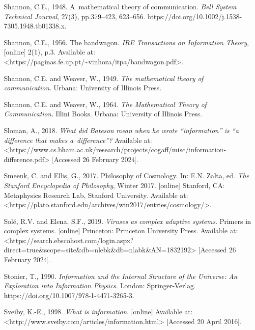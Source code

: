 Shannon, C.E., 1948. A~mathematical theory of communication. \textit{Bell System Technical Journal}, 27(3), pp.379–423, 623–656. https://doi.org/10.1002/j.1538-7305.1948.tb01338.x.



Shannon, C.E., 1956. The bandwagon. \textit{IRE Transactions on Information Theory}, [online] 2(1), p.3. Available at: {\textless}https://paginas.fe.up.pt/\~{}vinhoza/itpa/bandwagon.pdf{\textgreater}.



Shannon, C.E. and Weaver, W., 1949. \textit{The mathematical theory of communication}. Urbana: University of Illinois Press.



Shannon, C.E. and Weaver, W., 1964. \textit{The Mathematical Theory of Communication}. Illini Books. Urbana: University of Illinois Press.



Sloman, A., 2018. \textit{What did Bateson mean when he wrote ``information'' is ``a difference that makes a~difference''?} Available at: {\textless}https://www.cs.bham.ac.uk/research/projects/cogaff/misc/information-difference.pdf{\textgreater} [Accessed 26 February 2024].



Smeenk, C. and Ellis, G., 2017. Philosophy of Cosmology. In: E.N. Zalta, ed. \textit{The Stanford Encyclopedia of Philosophy}, Winter 2017. [online] Stanford, CA: Metaphysics Research Lab, Stanford University. Available at: {\textless}https://plato.stanford.edu/archives/win2017/entries/cosmology/{\textgreater}.



Solé, R.V. and Elena, S.F., 2019. \textit{Viruses as complex adaptive systems}. Primers in complex systems. [online] Princeton: Princeton University Press. Available at: {\textless}https://search.ebscohost.com/login.aspx?direct=true\&scope=site\&db=nlebk\&db=nlabk\&AN=1832192{\textgreater} [Accessed 26 February 2024].



Stonier, T., 1990. \textit{Information and the Internal Structure of the Universe: An Exploration into Information Physics}. London: Springer-Verlag. https://doi.org/10.1007/978-1-4471-3265-3.



Sveiby, K.-E., 1998. \textit{What is information}. [online] Available at: {\textless}http://www.sveiby.com/articles/information.html{\textgreater} [Accessed 20 April 2016].



